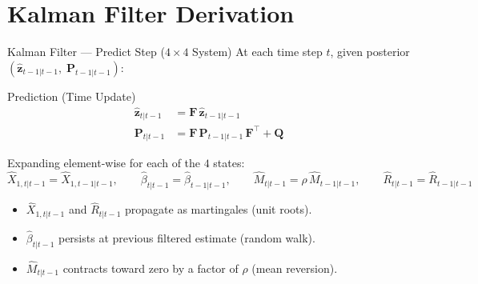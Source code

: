 \documentclass[10pt, aspectratio=169]{beamer}
\begin{document}
\section{Kalman Filter Derivation}

\begin{frame}{Kalman Filter --- Predict Step ($4 \times 4$ System)}
  At each time step $t$, given posterior $(\hat{\bm{z}}_{t-1|t-1},\; \bm{P}_{t-1|t-1})$:
  \vspace{6pt}
  \begin{block}{Prediction (Time Update)}
    \begin{align}
      \hat{\bm{z}}_{t|t-1} &= \bm{F}\,\hat{\bm{z}}_{t-1|t-1}
        \label{eq:predict_z}\\[6pt]
      \bm{P}_{t|t-1} &= \bm{F}\,\bm{P}_{t-1|t-1}\,\bm{F}^\top + \bm{Q}
        \label{eq:predict_P}
    \end{align}
  \end{block}
  \vspace{4pt}
  Expanding element-wise for each of the $4$ states:
  \[
    \hat{X}_{1,t|t-1} = \hat{X}_{1,t-1|t-1},\qquad
    \hat{\beta}_{t|t-1} = \hat{\beta}_{t-1|t-1},\qquad
    \hat{M}_{t|t-1} = \rho\,\hat{M}_{t-1|t-1},\qquad
    \hat{R}_{t|t-1} = \hat{R}_{t-1|t-1}
  \]
  \vspace{2pt}
  \begin{itemize}
    \item $\hat{X}_{1,t|t-1}$ and $\hat{R}_{t|t-1}$ propagate as martingales (unit roots).
    \item $\hat{\beta}_{t|t-1}$ persists at previous filtered estimate (random walk).
    \item $\hat{M}_{t|t-1}$ contracts toward zero by a factor of $\rho$ (mean reversion).
  \end{itemize}
\end{frame}
\end{document}
